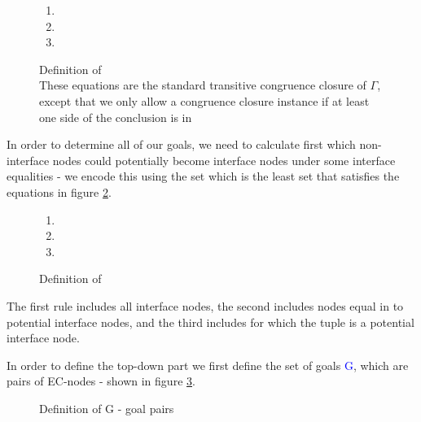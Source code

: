 \begin{figure}
\begin{enumerate}
	\item {}
	\item {}
	\item {}
\end{enumerate}
\caption{Definition of \eqg{}\\
These equations are the standard transitive congruence closure of $\Gamma$, 
except that we only allow a congruence closure instance if at least one side of the conclusion is in  }
\label{eqg_def}
\end{figure}

In order to determine all of our goals, we need to calculate first which non-interface nodes could potentially become interface nodes under some interface equalities - we encode this using the set  which is the least set that satisfies the equations in figure \ref{Igamma_def}.

\begin{figure}
\begin{enumerate}
	\item {}
	\item {}
	\item {}
\end{enumerate}
\caption{Definition of \\
}
\label{Igamma_def}
\end{figure}

The first rule includes all interface nodes, 
the second includes nodes equal in \eqg{} to potential interface nodes, 
and the third includes \GFAs{} for which the tuple is a potential interface node.

In order to define the top-down part we first define the set of goals \textcolor{blue}{G}, which are pairs of EC-nodes - shown in figure \ref{goals_def}.

\begin{figure}
\caption{Definition of G - goal pairs}
\label{goals_def}
\end{figure}


